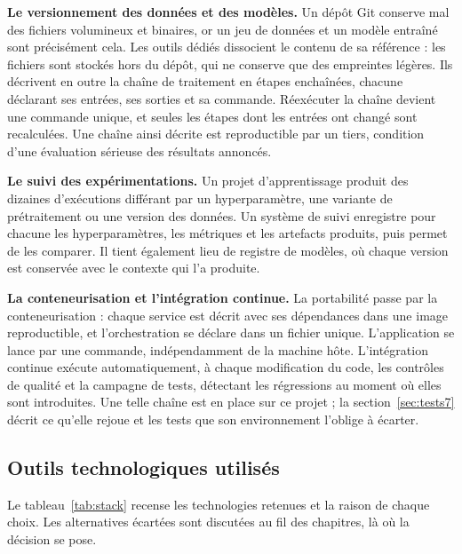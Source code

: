 \textbf{Le versionnement des données et des modèles.} Un dépôt Git conserve mal des fichiers volumineux et binaires, or un jeu de données et un modèle
entraîné sont précisément cela. Les outils dédiés dissocient le contenu de sa référence : les
fichiers sont stockés hors du dépôt, qui ne conserve que des empreintes légères. Ils décrivent en
outre la chaîne de traitement en étapes enchaînées, chacune déclarant ses entrées, ses sorties et sa
commande. Réexécuter la chaîne devient une commande unique, et seules les étapes dont les entrées
ont changé sont recalculées. Une chaîne ainsi décrite est reproductible par un tiers, condition
d'une évaluation sérieuse des résultats annoncés.

\textbf{Le suivi des expérimentations.} Un projet d'apprentissage produit des dizaines d'exécutions différant par un hyperparamètre, une
variante de prétraitement ou une version des données. Un système de suivi enregistre pour chacune
les hyperparamètres, les métriques et les artefacts produits, puis permet de les comparer. Il tient
également lieu de registre de modèles, où chaque version est conservée avec le contexte qui l'a
produite.

\textbf{La conteneurisation et l'intégration continue.} La portabilité passe par la conteneurisation : chaque service est décrit avec ses dépendances dans
une image reproductible, et l'orchestration se déclare dans un fichier unique. L'application se
lance par une commande, indépendamment de la machine hôte. L'intégration continue exécute
automatiquement, à chaque modification du code, les contrôles de qualité et la campagne de tests,
détectant les régressions au moment où elles sont introduites. Une telle chaîne est en place sur
ce projet ; la section~\ref{sec:tests7} décrit ce qu'elle rejoue et les tests que son environnement
l'oblige à écarter.

\subsection{Outils technologiques utilisés}

Le tableau~\ref{tab:stack} recense les technologies retenues et la raison de chaque choix. Les
alternatives écartées sont discutées au fil des chapitres, là où la décision se pose.

